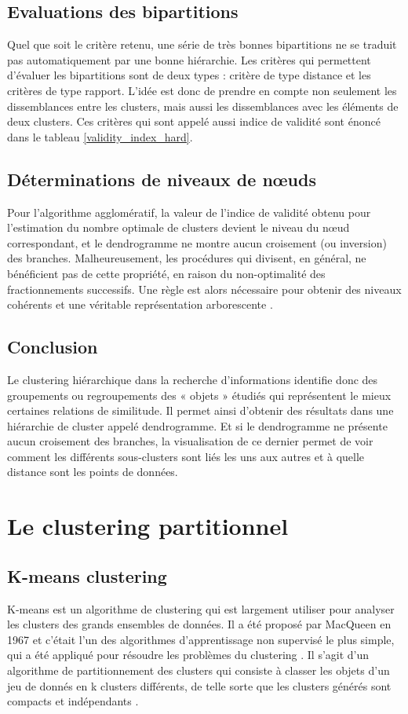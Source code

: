 \subsection{Evaluations des bipartitions}
Quel que soit le critère retenu, une série de très bonnes bipartitions ne se traduit pas automatiquement par une bonne hiérarchie. Les critères qui permettent d’évaluer les bipartitions sont de deux types : critère de type distance et les critères de type rapport. L’idée est donc de prendre en compte non seulement les dissemblances entre les clusters, mais aussi les dissemblances avec les éléments de deux clusters. Ces critères qui sont appelé aussi indice de validité sont énoncé dans le tableau \ref{validity_index_hard}.

\subsection{Déterminations de niveaux de nœuds }
Pour l’algorithme agglomératif, la valeur de l’indice de validité obtenu pour l’estimation du nombre optimale de clusters devient le niveau du nœud correspondant, et le dendrogramme ne montre aucun croisement (ou inversion) des branches. Malheureusement, les procédures qui divisent, en général, ne bénéficient pas de cette propriété, en raison du non-optimalité des fractionnements successifs. Une règle est alors nécessaire pour obtenir des niveaux cohérents et une véritable représentation arborescente \cite{roux2018comparative}.
\subsection{Conclusion}
Le clustering hiérarchique dans la recherche d'informations identifie donc des groupements ou regroupements des « objets » étudiés qui représentent le mieux certaines relations de similitude. Il permet ainsi d’obtenir des résultats dans une hiérarchie de cluster appelé dendrogramme. Et si le dendrogramme ne présente aucun croisement des branches, la visualisation de ce dernier permet de voir comment les différents sous-clusters sont liés les uns aux autres et à quelle distance sont les points de données.
\section{Le clustering partitionnel}

\subsection{K-means clustering}
K-means est un algorithme de clustering qui est largement utiliser pour analyser les clusters des grands ensembles de données. Il a été proposé par MacQueen en 1967 et c’était l’un des algorithmes d’apprentissage non supervisé le plus simple, qui a été appliqué pour résoudre les problèmes du clustering \cite{sun2008clustering}. Il s'agit d'un algorithme de partitionnement des clusters qui consiste à classer les objets d’un jeu de donnés en k clusters différents, de telle sorte que les clusters générés sont compacts et indépendants \cite{na2010research}.

